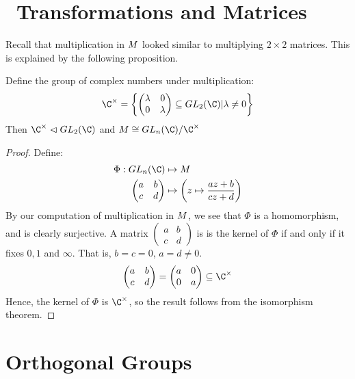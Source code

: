 \documentclass[../Main.tex]{subfiles}
\begin{document}
\section{\Mobius~Transformations and Matrices}
Recall that multiplication in $M$ looked similar to multiplying $2 \times 2$ matrices. This is explained by the following proposition.
\begin{proposition}
    Define the group of complex numbers under multiplication:
    \begin{equation*}
        \Ccross = \left\{
        \begin{pmatrix}
            \lambda & 0 \\
            0 & \lambda
        \end{pmatrix} \subseteq GL_2(\C) | \lambda \neq 0 \right\}
    \end{equation*}
    Then $\Ccross \normalin GL_2(\C)$ and $\mobgrp \cong GL_n(\C) / \Ccross$
\end{proposition}
\begin{proof}
    Define:
    \begin{align*}
        \Phi : GL_n(\C) &\mapsto \mobgrp \\
        \begin{pmatrix}a & b \\ c & d\end{pmatrix} &\mapsto \left(z \mapsto \frac{az + b}{cz + d}\right)
    \end{align*}
    By our computation of multiplication in $M$, we see that $\Phi$ is a homomorphism, and is clearly surjective. A matrix $\begin{pmatrix} a & b \\ c & d\end{pmatrix}$ is is the kernel of $\Phi$ if and only if it fixes $0, 1$ and $\infty$. That is, $b = c = 0$, $a = d \neq 0$.
    \begin{equation*}
        \begin{pmatrix}a & b \\ c & d\end{pmatrix} = \begin{pmatrix}a & 0 \\ 0 & a\end{pmatrix} \subseteq \Ccross
    \end{equation*}
    Hence, the kernel of $\Phi$ is $\Ccross$, so the result follows from the isomorphism theorem.
\end{proof}
\section{Orthogonal Groups}
\end{document}

